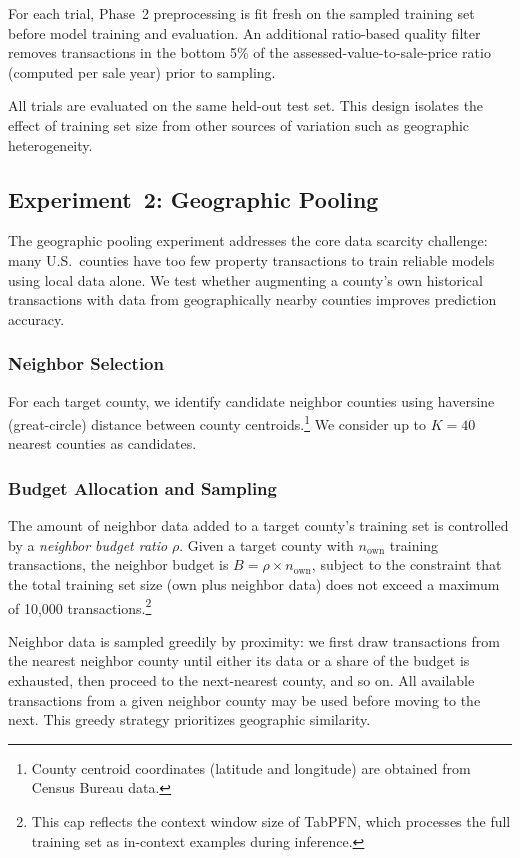 For each trial, Phase~2 preprocessing is fit fresh on the sampled training set before model training and evaluation. An additional ratio-based quality filter removes transactions in the bottom 5\% of the assessed-value-to-sale-price ratio (computed per sale year) prior to sampling.

All trials are evaluated on the same held-out test set. This design isolates the effect of training set size from other sources of variation such as geographic heterogeneity.

\subsection{Experiment~2: Geographic Pooling}\label{sec:geo_pooling}

The geographic pooling experiment addresses the core data scarcity challenge: many U.S.\ counties have too few property transactions to train reliable models using local data alone. We test whether augmenting a county's own historical transactions with data from geographically nearby counties improves prediction accuracy.

\subsubsection{Neighbor Selection}

For each target county, we identify candidate neighbor counties using haversine (great-circle) distance between county centroids.\footnote{County centroid coordinates (latitude and longitude) are obtained from Census Bureau data.} We consider up to $K = 40$ nearest counties as candidates.

\subsubsection{Budget Allocation and Sampling}

The amount of neighbor data added to a target county's training set is controlled by a \emph{neighbor budget ratio} $\rho$. Given a target county with $n_{\text{own}}$ training transactions, the neighbor budget is $B = \rho \times n_{\text{own}}$, subject to the constraint that the total training set size (own plus neighbor data) does not exceed a maximum of 10,000 transactions.\footnote{This cap reflects the context window size of TabPFN, which processes the full training set as in-context examples during inference.}

Neighbor data is sampled greedily by proximity: we first draw transactions from the nearest neighbor county until either its data or a share of the budget is exhausted, then proceed to the next-nearest county, and so on. All available transactions from a given neighbor county may be used before moving to the next. This greedy strategy prioritizes geographic similarity.

